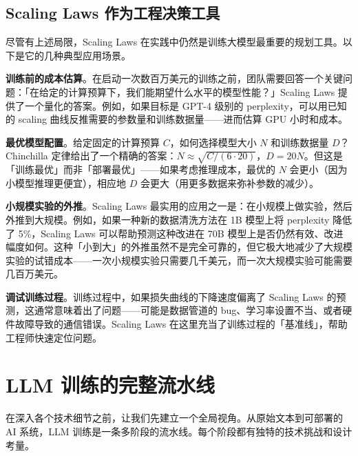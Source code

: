 \subsection{Scaling Laws 作为工程决策工具}

尽管有上述局限，Scaling Laws 在实践中仍然是训练大模型最重要的规划工具。以下是它的几种典型应用场景。

\textbf{训练前的成本估算}。在启动一次数百万美元的训练之前，团队需要回答一个关键问题：「在给定的计算预算下，我们能期望什么水平的模型性能？」Scaling Laws 提供了一个量化的答案。例如，如果目标是 GPT-4 级别的 perplexity，可以用已知的 scaling 曲线反推需要的参数量和训练数据量——进而估算 GPU 小时和成本。

\textbf{最优模型配置}。给定固定的计算预算 $C$，如何选择模型大小 $N$ 和训练数据量 $D$？Chinchilla 定律给出了一个精确的答案：$N \approx \sqrt{C/(6 \cdot 20)}$，$D = 20N$。但这是「训练最优」而非「部署最优」——如果考虑推理成本，最优的 $N$ 会更小（因为小模型推理更便宜），相应地 $D$ 会更大（用更多数据来弥补参数的减少）。

\textbf{小规模实验的外推}。Scaling Laws 最实用的应用之一是：在小规模上做实验，然后外推到大规模。例如，如果一种新的数据清洗方法在 1B 模型上将 perplexity 降低了 5\%，Scaling Laws 可以帮助预测这种改进在 70B 模型上是否仍然有效、改进幅度如何。这种「小到大」的外推虽然不是完全可靠的，但它极大地减少了大规模实验的试错成本——一次小规模实验只需要几千美元，而一次大规模实验可能需要几百万美元。

\textbf{调试训练过程}。训练过程中，如果损失曲线的下降速度偏离了 Scaling Laws 的预测，这通常意味着出了问题——可能是数据管道的 bug、学习率设置不当、或者硬件故障导致的通信错误。Scaling Laws 在这里充当了训练过程的「基准线」，帮助工程师快速定位问题。

\section{LLM 训练的完整流水线}

在深入各个技术细节之前，让我们先建立一个全局视角。从原始文本到可部署的 AI 系统，LLM 训练是一条多阶段的流水线。每个阶段都有独特的技术挑战和设计考量。

